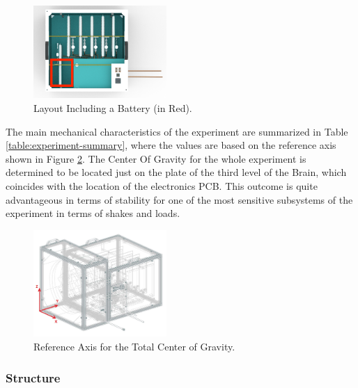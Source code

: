 \begin{figure}[H]
    \centering
    \includegraphics[width=0.45\textwidth]{4-experiment-design/img/Mechanical/Figure_15.png}
    \caption{Layout Including a Battery (in Red).}
    \label{battery_distribution}
\end{figure}

The main mechanical characteristics of the experiment are summarized in Table \ref{table:experiment-summary}, where the values are based on the reference axis shown in Figure \ref{COG}. The Center Of Gravity for the whole experiment is determined to be located just on the plate of the third level of the Brain, which coincides with the location of the electronics PCB. This outcome is quite advantageous in terms of stability for one of the most sensitive subsystems of the experiment in terms of shakes and loads. %



 \begin{figure}[H]
     \centering
     \includegraphics[width=0.45\textwidth]{4-experiment-design/img/Mechanical/COG.jpg}
     \caption{Reference Axis for the Total Center of Gravity.}
     \label{COG}
\end{figure}

\pagebreak
\subsubsection{Structure}
\label{sec:4.4.1}

